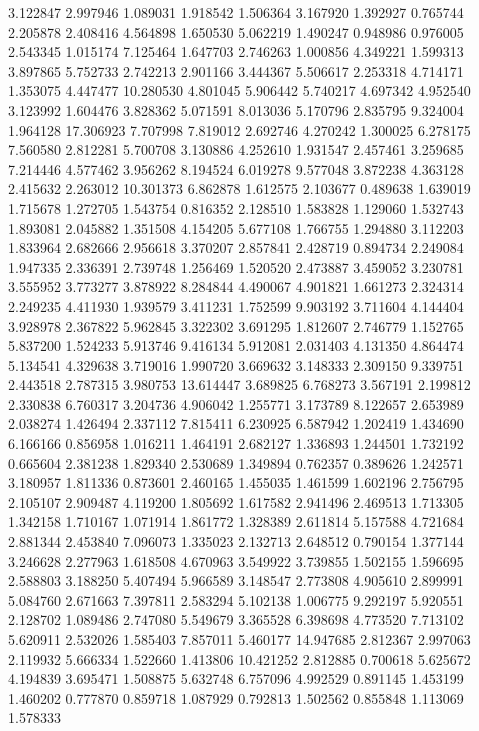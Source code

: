 3.122847
2.997946
1.089031
1.918542
1.506364
3.167920
1.392927
0.765744
2.205878
2.408416
4.564898
1.650530
5.062219
1.490247
0.948986
0.976005
2.543345
1.015174
7.125464
1.647703
2.746263
1.000856
4.349221
1.599313
3.897865
5.752733
2.742213
2.901166
3.444367
5.506617
2.253318
4.714171
1.353075
4.447477
10.280530
4.801045
5.906442
5.740217
4.697342
4.952540
3.123992
1.604476
3.828362
5.071591
8.013036
5.170796
2.835795
9.324004
1.964128
17.306923
7.707998
7.819012
2.692746
4.270242
1.300025
6.278175
7.560580
2.812281
5.700708
3.130886
4.252610
1.931547
2.457461
3.259685
7.214446
4.577462
3.956262
8.194524
6.019278
9.577048
3.872238
4.363128
2.415632
2.263012
10.301373
6.862878
1.612575
2.103677
0.489638
1.639019
1.715678
1.272705
1.543754
0.816352
2.128510
1.583828
1.129060
1.532743
1.893081
2.045882
1.351508
4.154205
5.677108
1.766755
1.294880
3.112203
1.833964
2.682666
2.956618
3.370207
2.857841
2.428719
0.894734
2.249084
1.947335
2.336391
2.739748
1.256469
1.520520
2.473887
3.459052
3.230781
3.555952
3.773277
3.878922
8.284844
4.490067
4.901821
1.661273
2.324314
2.249235
4.411930
1.939579
3.411231
1.752599
9.903192
3.711604
4.144404
3.928978
2.367822
5.962845
3.322302
3.691295
1.812607
2.746779
1.152765
5.837200
1.524233
5.913746
9.416134
5.912081
2.031403
4.131350
4.864474
5.134541
4.329638
3.719016
1.990720
3.669632
3.148333
2.309150
9.339751
2.443518
2.787315
3.980753
13.614447
3.689825
6.768273
3.567191
2.199812
2.330838
6.760317
3.204736
4.906042
1.255771
3.173789
8.122657
2.653989
2.038274
1.426494
2.337112
7.815411
6.230925
6.587942
1.202419
1.434690
6.166166
0.856958
1.016211
1.464191
2.682127
1.336893
1.244501
1.732192
0.665604
2.381238
1.829340
2.530689
1.349894
0.762357
0.389626
1.242571
3.180957
1.811336
0.873601
2.460165
1.455035
1.461599
1.602196
2.756795
2.105107
2.909487
4.119200
1.805692
1.617582
2.941496
2.469513
1.713305
1.342158
1.710167
1.071914
1.861772
1.328389
2.611814
5.157588
4.721684
2.881344
2.453840
7.096073
1.335023
2.132713
2.648512
0.790154
1.377144
3.246628
2.277963
1.618508
4.670963
3.549922
3.739855
1.502155
1.596695
2.588803
3.188250
5.407494
5.966589
3.148547
2.773808
4.905610
2.899991
5.084760
2.671663
7.397811
2.583294
5.102138
1.006775
9.292197
5.920551
2.128702
1.089486
2.747080
5.549679
3.365528
6.398698
4.773520
7.713102
5.620911
2.532026
1.585403
7.857011
5.460177
14.947685
2.812367
2.997063
2.119932
5.666334
1.522660
1.413806
10.421252
2.812885
0.700618
5.625672
4.194839
3.695471
1.508875
5.632748
6.757096
4.992529
0.891145
1.453199
1.460202
0.777870
0.859718
1.087929
0.792813
1.502562
0.855848
1.113069
1.578333
